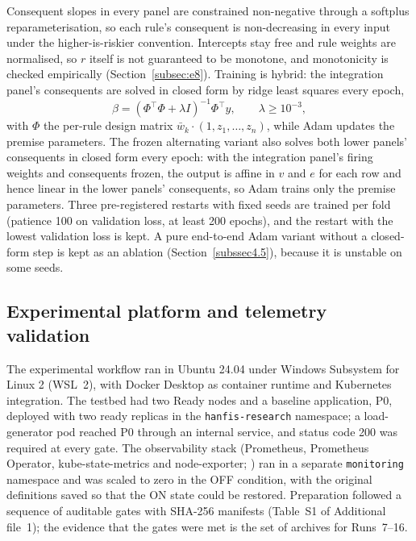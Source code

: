 \documentclass[referee,lineno,pdflatex,sn-basic]{sn-jnl}%
\theoremstyle{thmstyleone}%
\theoremstyle{thmstyletwo}%
\theoremstyle{thmstylethree}%
\begin{document}
Consequent slopes in every panel are constrained non-negative through a softplus reparameterisation, so each rule's consequent is non-decreasing in every input under the higher-is-riskier convention. Intercepts stay free and rule weights are normalised, so $r$ itself is not guaranteed to be monotone, and monotonicity is checked empirically (Section~\ref{subsec:e8}). Training is hybrid: the integration panel's consequents are solved in closed form by ridge least squares every epoch,
\begin{equation}
\beta=(\Phi^\top\Phi+\lambda I)^{-1}\Phi^\top y,\qquad \lambda\ge 10^{-3},
\end{equation}
with $\Phi$ the per-rule design matrix $\bar w_k\cdot(1,z_1,\dots,z_n)$, while Adam updates the premise parameters. The frozen alternating variant also solves both lower panels' consequents in closed form every epoch: with the integration panel's firing weights and consequents frozen, the output is affine in $v$ and $e$ for each row and hence linear in the lower panels' consequents, so Adam trains only the premise parameters. Three pre-registered restarts with fixed seeds are trained per fold (patience 100 on validation loss, at least 200 epochs), and the restart with the lowest validation loss is kept. A pure end-to-end Adam variant without a closed-form step is kept as an ablation (Section~\ref{subssec4.5}), because it is unstable on some seeds.

\subsection{Experimental platform and telemetry validation}
\label{subsec3.2}\label{subsec:overhead-protocol}
The experimental workflow ran in Ubuntu 24.04 under Windows Subsystem for Linux 2 (WSL~2), with Docker Desktop as container runtime and Kubernetes integration. The testbed had two Ready nodes and a baseline application, P0, deployed with two ready replicas in the \texttt{hanfis-research} namespace; a load-generator pod reached P0 through an internal service, and status code 200 was required at every gate. The observability stack (Prometheus, Prometheus Operator, kube-state-metrics and node-exporter; \citealp{prometheus_overview}) ran in a separate \texttt{monitoring} namespace and was scaled to zero in the OFF condition, with the original definitions saved so that the ON state could be restored. Preparation followed a sequence of auditable gates with SHA-256 manifests (Table~S1 of Additional file~1); the evidence that the gates were met is the set of archives for Runs~7--16.
\end{document}
